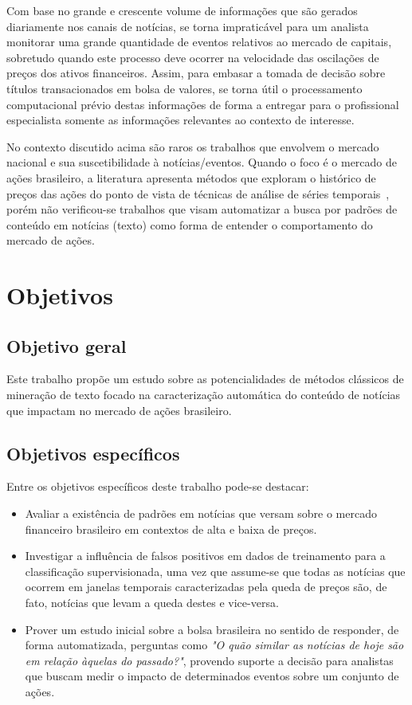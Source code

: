 \documentclass[11pt,a4paper]{article}
\begin{document}
Com base no grande e crescente volume de informações que são gerados diariamente nos canais de notícias, se torna impraticável para um analista monitorar uma grande quantidade de eventos relativos ao mercado de capitais, sobretudo quando este processo deve ocorrer na velocidade das oscilações de preços dos ativos financeiros. Assim, para embasar a tomada de decisão sobre títulos transacionados em bolsa de valores, se torna útil o processamento computacional prévio destas informações de forma a entregar para o profissional especialista somente as informações relevantes ao contexto de interesse. 

No contexto discutido acima são raros os trabalhos que envolvem o mercado nacional e sua suscetibilidade à notícias/eventos. Quando o foco é o mercado de ações brasileiro, a literatura apresenta métodos que exploram o histórico de preços das ações do ponto de vista de técnicas de análise de séries temporais~\cite{Edgard:Dissertacao}, porém não verificou-se trabalhos que visam automatizar a busca por padrões de conteúdo em notícias (texto) como forma de entender o comportamento do mercado de ações.

\section{Objetivos}\label{sec:objetivos}

\subsection{Objetivo geral}

Este trabalho propõe um estudo sobre as potencialidades de métodos clássicos de mineração de texto focado na caracterização automática do conteúdo de notícias que impactam no mercado de ações brasileiro.

\subsection{Objetivos específicos}

Entre os objetivos específicos deste trabalho pode-se destacar:

\begin{itemize}
  \item Avaliar a existência de padrões em notícias que versam sobre o mercado financeiro brasileiro em contextos de alta e baixa de preços.
  \item Investigar a influência de falsos positivos em dados de treinamento para a classificação supervisionada, uma vez que assume-se que todas as notícias que ocorrem em janelas temporais caracterizadas pela queda de preços são, de fato, notícias que levam a queda destes e vice-versa.
  \item Prover um estudo inicial sobre a bolsa brasileira no sentido de responder, de forma automatizada, perguntas como \textit{"O quão similar as notícias de hoje são em relação àquelas do passado?"}, provendo suporte a decisão para analistas que buscam medir o impacto de determinados eventos sobre um conjunto de ações.
\end{itemize}
\end{document}
